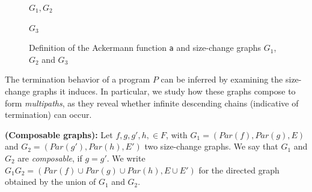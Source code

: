 \documentclass{article}
\begin{document}
\begin{example}
\begin{figure}[ht]
\begin{minipage}[b]{0.25\textwidth}
    $G_1, G_2$
  \end{minipage}
  \begin{minipage}[b]{0.25\textwidth}
    \centering
    
    \vspace{0.1cm}
    
    $G_3$
  \end{minipage}
  \caption{Definition of the Ackermann function \texttt{a} and size-change graphs $G_1$, $G_2$ and $G_3$}
  \label{figFuncF}
\end{figure}
\end{example}

The termination behavior of a program $P$ can be inferred by examining the size-change graphs it induces. In particular, we study how these graphs compose to form \emph{multipaths}, as they reveal whether infinite descending chains (indicative of termination) can occur.

\begin{definition}
    \textbf{(Composable graphs):} Let $f,g,g',h, \in F$, with $G_1 = (Par(f), Par(g), E)$ and $G_2 = (Par(g'), Par(h), E')$ two size-change graphs. We say that $G_1$ and $G_2$ are \emph{composable}, if $g = g'$. We write $G_1G_2 = (Par(f)\cup Par(g) \cup Par(h), E \cup E')$ for the directed graph obtained by the union of $G_1$ and $G_2$.
\end{definition}
\end{document}
